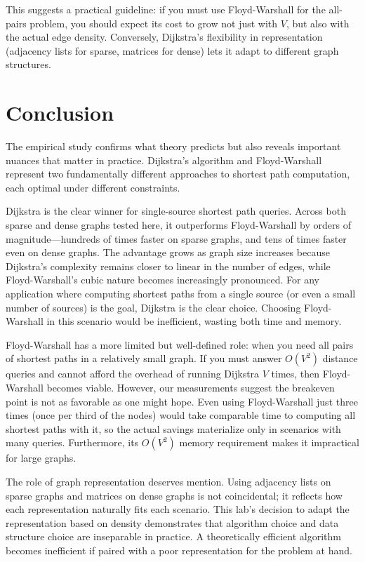 \documentclass{labreport}
\begin{document}
This suggests a practical guideline: if you must use Floyd-Warshall for the all-pairs problem, you should expect its cost to grow not just with $V$, but also with the actual edge density. Conversely, Dijkstra's flexibility in representation (adjacency lists for sparse, matrices for dense) lets it adapt to different graph structures.
\section{Conclusion}

The empirical study confirms what theory predicts but also reveals important nuances that matter in practice. Dijkstra's algorithm and Floyd-Warshall represent two fundamentally different approaches to shortest path computation, each optimal under different constraints.

Dijkstra is the clear winner for single-source shortest path queries. Across both sparse and dense graphs tested here, it outperforms Floyd-Warshall by orders of magnitude—hundreds of times faster on sparse graphs, and tens of times faster even on dense graphs. The advantage grows as graph size increases because Dijkstra's complexity remains closer to linear in the number of edges, while Floyd-Warshall's cubic nature becomes increasingly pronounced. For any application where computing shortest paths from a single source (or even a small number of sources) is the goal, Dijkstra is the clear choice. Choosing Floyd-Warshall in this scenario would be inefficient, wasting both time and memory.

Floyd-Warshall has a more limited but well-defined role: when you need all pairs of shortest paths in a relatively small graph. If you must answer $O(V^2)$ distance queries and cannot afford the overhead of running Dijkstra $V$ times, then Floyd-Warshall becomes viable. However, our measurements suggest the breakeven point is not as favorable as one might hope. Even using Floyd-Warshall just three times (once per third of the nodes) would take comparable time to computing all shortest paths with it, so the actual savings materialize only in scenarios with many queries. Furthermore, its $O(V^2)$ memory requirement makes it impractical for large graphs.

The role of graph representation deserves mention. Using adjacency lists on sparse graphs and matrices on dense graphs is not coincidental; it reflects how each representation naturally fits each scenario. This lab's decision to adapt the representation based on density demonstrates that algorithm choice and data structure choice are inseparable in practice. A theoretically efficient algorithm becomes inefficient if paired with a poor representation for the problem at hand.
\end{document}

